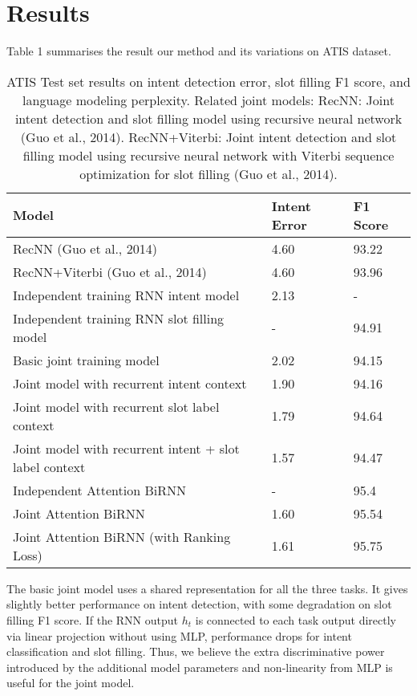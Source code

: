 \section{Results}
Table 1 summarises the result our method and its variations on ATIS dataset.
\begin{table}[h]
	\centering
\begin{tabular}{ |l|l|l| }
		\hline
		Model & Intent  Error & F1 Score \\ \hline
		RecNN (Guo et al., 2014) & 4.60 & 93.22 \\ \hline
		RecNN+Viterbi (Guo et al., 2014) & 4.60 & 93.96 \\ \hline
		Independent training RNN intent model & 2.13 & - \\ \hline
		Independent training RNN slot filling model & - & 94.91 \\ \hline
		Basic joint training model & 2.02 & 94.15 \\ \hline
		Joint model with recurrent intent context & 1.90 & 94.16 \\ \hline 
		Joint model with recurrent slot label context & 1.79 & 94.64 \\ \hline
		Joint model with recurrent intent + slot label context & 1.57 & 94.47 \\ \hline
		Independent Attention BiRNN & - & 95.4 \\ \hline
		Joint Attention BiRNN & 1.60 & 95.54 \\ \hline
		Joint Attention BiRNN (with Ranking Loss) & 1.61 & 95.75 \\ \hline
	\end{tabular}
	\caption[ATIS test set Results]{ATIS Test set results on intent detection error, slot filling F1 score, and language modeling perplexity. Related joint models: RecNN: Joint intent detection and slot filling model using recursive	neural network (Guo et al., 2014). RecNN+Viterbi: Joint intent detection and slot filling model using recursive neural network with Viterbi sequence optimization for slot filling (Guo et al., 2014).}
\end{table}
The basic joint model uses a shared representation for all the three tasks. It gives slightly
better performance on intent detection, with some degradation on slot
filling F1 score. If the RNN output $h_t$ is connected to each task output directly via linear projection without using MLP, performance drops for intent classification and slot filling. Thus, we believe the extra discriminative power introduced by the additional model parameters and non-linearity from MLP is useful for the joint model.
